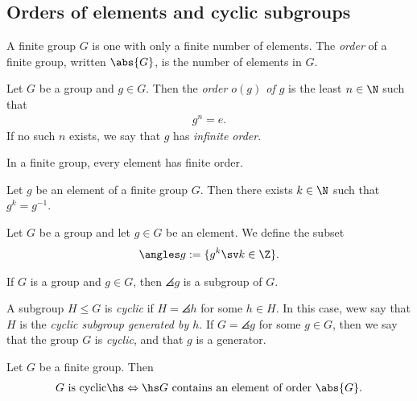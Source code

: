\documentclass{article}
\begin{document}
\subsection{Orders of elements and cyclic subgroups}

\setcounter{theorem}{2}
\begin{definition}
	A finite group $G$ is one with only a finite number of elements.
	The \emph{order} of a finite group, written $\abs{G}$, is the
	number of elements in $G$.
\end{definition}

\begin{definition}
	Let $G$ be a group and $g\in G$. Then the \emph{order $o(g)$ of $g$}
	is the least $n\in\N$ such that
	\begin{align*}
		g^n = e.
	\end{align*}
	If no such $n$ exists, we say that $g$ has \emph{infinite order}.
\end{definition}

\setcounter{theorem}{5}
\begin{theorem}
	In a finite group, every element has finite order.
\end{theorem}

\begin{corollary}
	Let $g$ be an element of a finite group $G$. Then there exists $k\in\N$
	such that $g^k=g^{-1}$.
\end{corollary}

\begin{definition}
	Let $G$ be a group and let $g\in G$ be an element. We define the
	subset
	\begin{align*}
		\angles g := \{g^k \sv k\in\Z\}.
	\end{align*}
\end{definition}

\begin{lemma}
	If $G$ is a group and $g\in G$, then $\angles g$ is a subgroup of $G$.
\end{lemma}

\begin{definition}
	A subgroup $H\leq G$ is \emph{cyclic} if $H=\angles h$ for some
	$h\in H$. In this case, wew say that $H$ is the \emph{cyclic subgroup
		generated by $h$}. If $G=\angles g$ for some $g\in G$, then we
	say that the group $G$ is \emph{cyclic}, and that $g$ is a generator.
\end{definition}

\setcounter{theorem}{13}
\begin{lemma}
	Let $G$ be a finite group. Then
	\begin{align*}
		\text{$G$ is cyclic} \hs\Leftrightarrow\hs \text{$G$ contains an element of order $\abs{G}$}.
	\end{align*}
\end{lemma}
\end{document}
